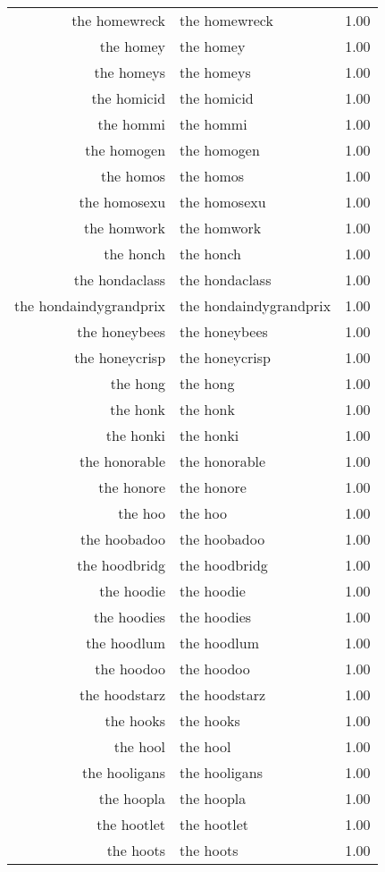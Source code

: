 \begin{table}[ht]
\begin{tabular}{rlr}
  the homewreck & the homewreck & 1.00 \\ 
  the homey & the homey & 1.00 \\ 
  the homeys & the homeys & 1.00 \\ 
  the homicid & the homicid & 1.00 \\ 
  the hommi & the hommi & 1.00 \\ 
  the homogen & the homogen & 1.00 \\ 
  the homos & the homos & 1.00 \\ 
  the homosexu & the homosexu & 1.00 \\ 
  the homwork & the homwork & 1.00 \\ 
  the honch & the honch & 1.00 \\ 
  the hondaclass & the hondaclass & 1.00 \\ 
  the hondaindygrandprix & the hondaindygrandprix & 1.00 \\ 
  the honeybees & the honeybees & 1.00 \\ 
  the honeycrisp & the honeycrisp & 1.00 \\ 
  the hong & the hong & 1.00 \\ 
  the honk & the honk & 1.00 \\ 
  the honki & the honki & 1.00 \\ 
  the honorable & the honorable & 1.00 \\ 
  the honore & the honore & 1.00 \\ 
  the hoo & the hoo & 1.00 \\ 
  the hoobadoo & the hoobadoo & 1.00 \\ 
  the hoodbridg & the hoodbridg & 1.00 \\ 
  the hoodie & the hoodie & 1.00 \\ 
  the hoodies & the hoodies & 1.00 \\ 
  the hoodlum & the hoodlum & 1.00 \\ 
  the hoodoo & the hoodoo & 1.00 \\ 
  the hoodstarz & the hoodstarz & 1.00 \\ 
  the hooks & the hooks & 1.00 \\ 
  the hool & the hool & 1.00 \\ 
  the hooligans & the hooligans & 1.00 \\ 
  the hoopla & the hoopla & 1.00 \\ 
  the hootlet & the hootlet & 1.00 \\ 
  the hoots & the hoots & 1.00 \\ 

\end{tabular}
\end{table}
